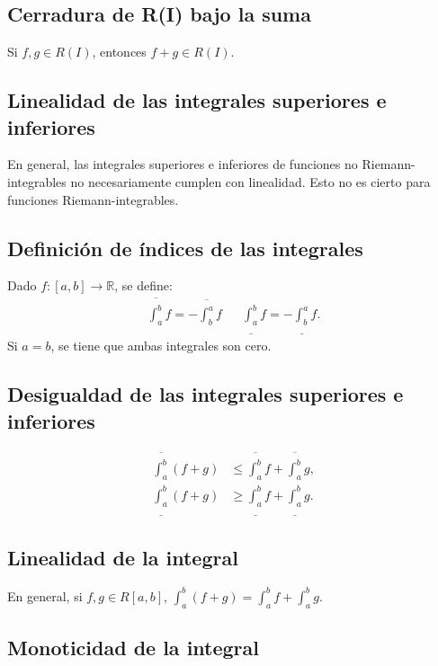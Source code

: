 \documentclass{article}
\begin{document}
\subsection*{Cerradura de R(I) bajo la suma}

Si $f,g\in R(I)$, entonces $f+g\in R(I)$.

\subsection*{Linealidad de las integrales superiores e inferiores}

En general, las integrales superiores e inferiores de funciones no Riemann-integrables no necesariamente cumplen con linealidad. Esto no es cierto para funciones Riemann-integrables.

\subsection*{Definición de índices de las integrales}

Dado $f:[a,b]\to\mathbb{R}$, se define:
\begin{align*}
\overline{\int_a^b}f=-\overline{\int_b^a}f && \underline{\int_a^b}f=-\underline{\int_b^a}f.
\end{align*}
Si $a=b$, se tiene que ambas integrales son cero.

\subsection*{Desigualdad de las integrales superiores e inferiores}

\begin{align*}
\overline{\int_a^b}(f+g)&\leq \overline{\int_a^b}f+\overline{\int_a^b}g,\\
\underline{\int_a^b}(f+g)&\geq \underline{\int_a^b}f+\underline{\int_a^b}g.
\end{align*}

\subsection*{Linealidad de la integral}

En general, si $f,g\in R[a,b]$, $\displaystyle \int_a^b (f+g)=\int_a^b f+\int_a^b g$.

\subsection*{Monoticidad de la integral}
\end{document}
